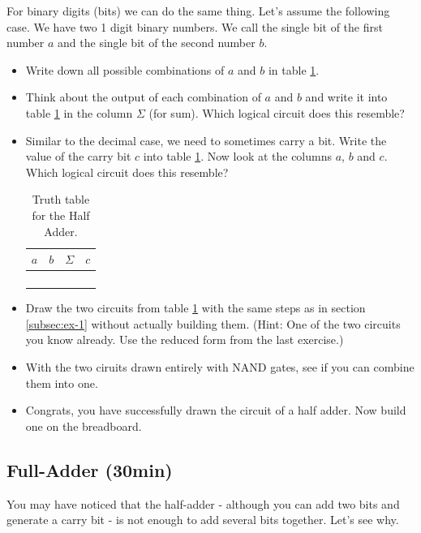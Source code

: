 \documentclass[10pt,a4paper]{article}
\begin{document}
For binary digits (bits) we can do the same thing. Let's assume the following case. We have two 1 digit binary numbers. We call the single bit of the first number $a$ and the single bit of the second number $b$.
\begin{itemize}
	\item Write down all possible combinations of $a$ and $b$ in table \ref{tab:half-adder-truth-table}.
	\item Think about the output of each combination of $a$ and $b$ and write it into table \ref{tab:half-adder-truth-table} in the column $\Sigma$ (for sum). Which logical circuit does this resemble?
	\item Similar to the decimal case, we need to sometimes carry a bit. Write the value of the carry bit $c$ into table \ref{tab:half-adder-truth-table}. Now look at the columns $a$, $b$ and $c$. Which logical circuit does this resemble?
	
	\begin{table}[H]
		\centering
		\begin{tabular}{|c|c||c|c|}
			\hline
			$a$ & $b$ & $\Sigma$   & $c$ \\ \hline
			&     &           &       \\ \hline
			&     &           &       \\ \hline
			&     &           &       \\ \hline
			&     &           &       \\ \hline
		\end{tabular}
		\caption{Truth table for the Half Adder.}
		\label{tab:half-adder-truth-table}
	\end{table}
	
	\item Draw the two circuits from table \ref{tab:half-adder-truth-table} with the same steps as in section \ref{subsec:ex-1} without actually building them. (Hint: One of the two circuits you know already. Use the reduced form from the last exercise.)
	\item With the two ciruits drawn entirely with NAND gates, see if you can combine them into one.
	\item Congrats, you have successfully drawn the circuit of a half adder. Now build one on the breadboard.
\end{itemize}
\subsection{Full-Adder (30min)}
You may have noticed that the half-adder - although you can add two bits and generate a carry bit - is not enough to add several bits together. Let's see why.
\end{document}
